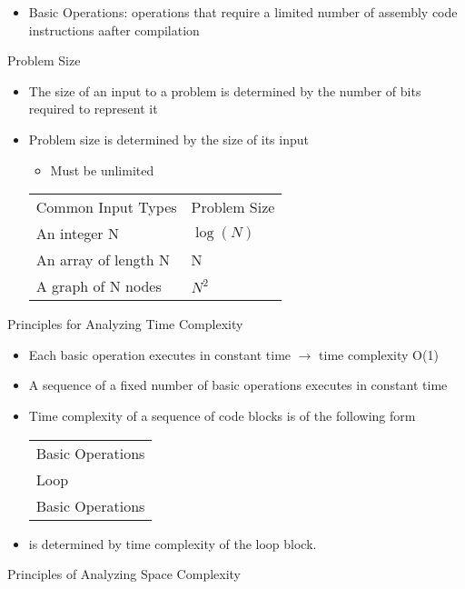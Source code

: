   \begin{itemize}
  \item Basic Operations: operations that require a limited number of assembly code instructions aafter compilation
  \end{itemize}
\item Problem Size
  \begin{itemize}
  \item The size of an input to a problem is determined by the number of bits required to represent it
  \item Problem size is determined by the size of its input
    \begin{itemize}
    \item Must be unlimited
    \end{itemize}
  \begin{tabular}{l l}
  \rowcolor{LightCyan} Common Input Types & Problem Size \\
  \rowcolor{DarkCyan} An integer N & $\log{(N)}$ \\
  \rowcolor{LightCyan} An array of length N & N \\
  \rowcolor{DarkCyan} A graph of N nodes & $N^{2}$
  \end{tabular}
  \end{itemize}
\item Principles for Analyzing Time Complexity
  \begin{itemize}
  \item Each basic operation executes in constant time $\rightarrow$ time complexity O(1)
  \item A sequence of a fixed number of basic operations executes in constant time
  \item Time complexity of a sequence of code blocks is of the following form
  \begin{tabular}{l}
  \rowcolor{LightCyan} Basic Operations \\
  \rowcolor{DarkCyan} Loop \\
  \rowcolor{LightCyan}Basic Operations
  \end{tabular}
  \item[] is determined by time complexity of the loop block.
  \end{itemize}
\item Principles of Analyzing Space Complexity
